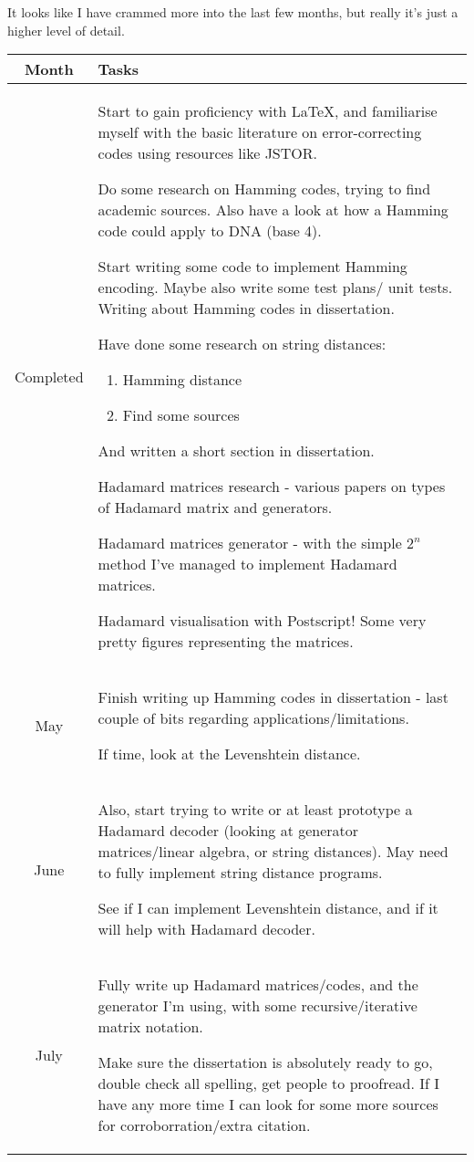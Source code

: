 \documentclass[a4paper,11pt]{article}
\begin{document}
    It looks like I have crammed more into the last few months, but really it's
    just a higher level of detail.

    \begin{center}
    {
    \renewcommand{\arraystretch}{1.3}
    \begin{longtable}{c p{}}
    \toprule
    Month & Tasks \\
    \midrule
    \rowcolor{green} Completed &
    Start to gain proficiency with \LaTeX, and familiarise myself with the basic
    literature on error-correcting codes using resources like JSTOR.

    Do some research on Hamming codes, trying to find academic sources. Also
    have a look at how a Hamming code could apply to DNA (base 4).

    Start writing some code to implement Hamming encoding. Maybe also write some
    test plans/ unit tests. Writing about Hamming codes in
    dissertation.

    Have done some research on string distances:
    \begin{enumerate}
        \item Hamming distance
        \item Find some sources
    \end{enumerate}
    And written a short section in dissertation.

    Hadamard matrices research - various papers on types of Hadamard matrix and
    generators.

    Hadamard matrices generator - with the simple $2^n$ method I've managed to
    implement Hadamard matrices.

    Hadamard visualisation with Postscript! Some very pretty figures
    representing the matrices. \\

    May &
    Finish writing up Hamming codes in dissertation - last couple of bits
    regarding applications/limitations.

    If time, look at the Levenshtein distance.

    \\


    June &
    Also, start trying to write or at least prototype a Hadamard decoder
    (looking at generator matrices/linear algebra, or string distances). May
    need to fully implement string distance programs.

    See if I can implement Levenshtein distance, and if it will help with
    Hadamard decoder. \\

    July &
    Fully write up Hadamard matrices/codes, and the generator I'm using, with
    some recursive/iterative matrix notation.

    Make sure the dissertation is absolutely ready to go, double check all
    spelling, get people to proofread.
    If I have any more time I can look for some more sources for
    corroborration/extra citation. \\
    \bottomrule
    \end{longtable}
    }
    \end{center}
\end{document}
